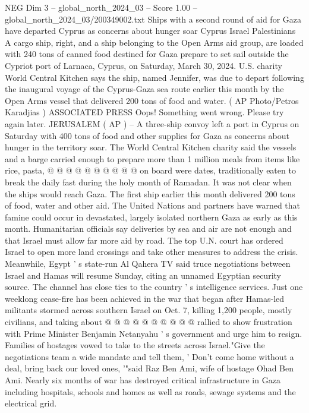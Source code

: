 \begin{textsample}{NEG Dim 3 – global\_north\_2024\_03 – Score 1.00 – global\_north\_2024\_03/200349002.txt}  \label{ex:f3_neg_168}
Ships with a second round of aid for Gaza have departed Cyprus as concerns about hunger soar Cyprus Israel Palestinians A cargo ship, right, and a ship belonging to the Open Arms aid group, are loaded with 240 tons of canned food destined for Gaza prepare to set sail outside the Cypriot port of Larnaca, Cyprus, on Saturday, March 30, 2024.
U.S. charity World Central Kitchen says the ship, named Jennifer, was due to depart following the inaugural voyage of the Cyprus-Gaza sea route earlier this month by the Open Arms vessel that delivered 200 tons of food and water. ( AP Photo/Petros Karadjias ) ASSOCIATED PRESS Oops!
Something went wrong.
Please try again later.
JERUSALEM ( AP ) -- A three-ship convoy left a port in Cyprus on Saturday with 400 tons of food and other supplies for Gaza as concerns about hunger in the territory soar.
The World Central Kitchen charity said the vessels and a barge carried enough to prepare more than 1 million meals from items like rice, pasta, @ @ @ @ @ @ @ @ @ @ on board were dates, traditionally eaten to break the daily fast during the holy month of Ramadan.
It was not clear when the ships would reach Gaza.
The first ship earlier this month delivered 200 tons of food, water and other aid.
The United Nations and partners have warned that famine could occur in devastated, largely isolated northern Gaza as early as this month.
Humanitarian officials say deliveries by sea and air are not enough and that Israel must allow far more aid by road.
The top U.N. court has ordered Israel to open more land crossings and take other measures to address the crisis.
Meanwhile, Egypt ' s state-run Al Qahera TV said truce negotiations between Israel and Hamas will resume Sunday, citing an unnamed Egyptian security source.
The channel has close ties to the country ' s intelligence services.
Just one weeklong cease-fire has been achieved in the war that began after Hamas-led militants stormed across southern Israel on Oct. 7, killing 1,200 people, mostly civilians, and taking about @ @ @ @ @ @ @ @ @ @ rallied to show frustration with Prime Minister Benjamin Netanyahu ' s government and urge him to resign.
Families of hostages vowed to take to the streets across Israel."Give the negotiations team a wide mandate and tell them, ' Don't come home without a deal, bring back our loved ones, '"said Raz Ben Ami, wife of hostage Ohad Ben Ami.
Nearly six months of war has destroyed critical infrastructure in Gaza including hospitals, schools and homes as well as roads, sewage systems and the electrical grid.

\end{textsample}
